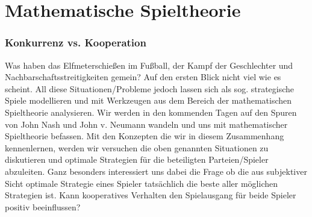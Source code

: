 \documentclass[
    a4paper,     %
        headsepline, %
        halfparskip,     %
        fleqn,       %
    10pt         %
    ]{scrartcl}  %
\begin{document}
    \section*{Mathematische Spieltheorie}
    \subsubsection*{Konkurrenz vs. Kooperation}

    Was haben das Elfmeterschie{\ss}en im Fu{\ss}ball, der Kampf der Geschlechter und Nachbarschaftsstreitigkeiten 
    gemein? Auf den ersten Blick nicht viel wie es scheint. All diese Situationen/Probleme jedoch lassen sich
    als sog. strategische Spiele modellieren und mit Werkzeugen aus dem Bereich der mathematischen Spieltheorie
    analysieren.
    \newline
    Wir werden in den kommenden Tagen auf den Spuren von John Nash und John v. Neumann wandeln und uns mit  
    mathematischer Spieltheorie befassen. Mit den Konzepten die wir in diesem Zusammenhang kennenlernen, werden 
    wir versuchen die oben genannten Situationen zu diskutieren und optimale Strategien f{\"u}r die 
    beteiligten Parteien/Spieler abzuleiten. Ganz besonders interessiert uns dabei die Frage ob die aus subjektiver Sicht optimale
    Strategie eines Spieler tats{\"a}chlich die beste aller m{\"o}glichen Strategien ist. Kann kooperatives Verhalten den Spielausgang
    f{\"u}r beide Spieler positiv beeinflussen?
\end{document}
